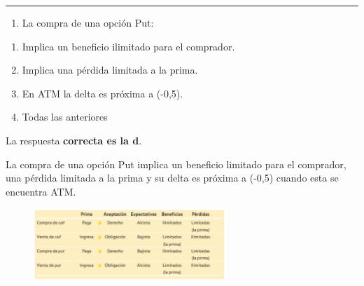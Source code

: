 \documentclass[
  letterpaper,
  DIV=11,
  numbers=noendperiod]{scrreprt}
\providecommand{\tightlist}{%
  \setlength{\itemsep}{0pt}\setlength{\parskip}{0pt}}\usepackage{longtable,booktabs,array}
\begin{document}
\begin{center}\rule{0.5\linewidth}{0.5pt}\end{center}

\begin{enumerate}
\def\labelenumi{\arabic{enumi}.}
\setcounter{enumi}{45}
\tightlist
\item
  La compra de una opción Put:
\end{enumerate}

\begin{enumerate}
\def\labelenumi{\alph{enumi})}
\item
  Implica un beneficio ilimitado para el comprador.
\item
  Implica una pérdida limitada a la prima.
\item
  En ATM la delta es próxima a (-0,5).
\item
  Todas las anteriores
\end{enumerate}

\begin{tcolorbox}[enhanced jigsaw, left=2mm, opacityback=0, colback=white, breakable, arc=.35mm, bottomrule=.15mm, rightrule=.15mm, toprule=.15mm, leftrule=.75mm, colframe=quarto-callout-tip-color-frame]
\begin{minipage}[t]{5.5mm}
\textcolor{quarto-callout-tip-color}{\faLightbulb}
\end{minipage}%
\begin{minipage}[t]{\textwidth - 5.5mm}

La respuesta \textbf{correcta es la d}.

La compra de una opción Put implica un beneficio limitado para el
comprador, una pérdida limitada a la prima y su delta es próxima a
(-0,5) cuando esta se encuentra ATM.

\begin{figure}[H]

{\centering \includegraphics[width=0.65\textwidth,height=\textheight]{./images/resumen-opciones.png}

}

\end{figure}

\end{minipage}%
\end{tcolorbox}
\end{document}
